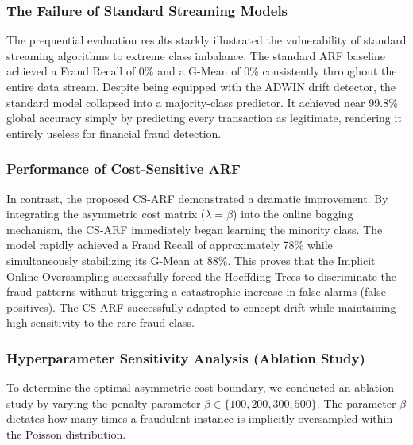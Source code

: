 \subsubsection{The Failure of Standard Streaming Models}
The prequential evaluation results starkly illustrated the vulnerability of standard streaming algorithms to extreme class imbalance. The standard ARF baseline achieved a Fraud Recall of 0\% and a G-Mean of 0\% consistently throughout the entire data stream. Despite being equipped with the ADWIN drift detector, the standard model collapsed into a majority-class predictor. It achieved near 99.8\% global accuracy simply by predicting every transaction as legitimate, rendering it entirely useless for financial fraud detection.

\subsubsection{Performance of Cost-Sensitive ARF}
In contrast, the proposed CS-ARF demonstrated a dramatic improvement. By integrating the asymmetric cost matrix ($\lambda = \beta$) into the online bagging mechanism, the CS-ARF immediately began learning the minority class. The model rapidly achieved a Fraud Recall of approximately 78\% while simultaneously stabilizing its G-Mean at 88\%. This proves that the Implicit Online Oversampling successfully forced the Hoeffding Trees to discriminate the fraud patterns without triggering a catastrophic increase in false alarms (false positives). The CS-ARF successfully adapted to concept drift while maintaining high sensitivity to the rare fraud class.

\subsubsection{Hyperparameter Sensitivity Analysis (Ablation Study)}
To determine the optimal asymmetric cost boundary, we conducted an ablation study by varying the penalty parameter $\beta \in \{100, 200, 300, 500\}$. The parameter $\beta$ dictates how many times a fraudulent instance is implicitly oversampled within the Poisson distribution.

